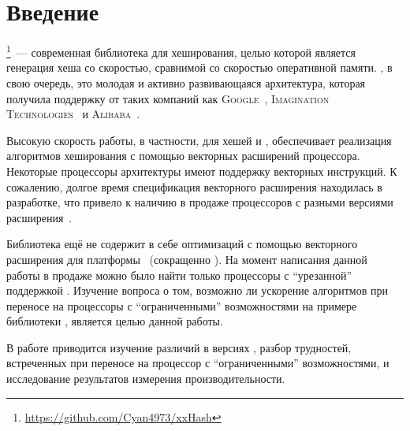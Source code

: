 
\section*{Введение}
\thispagestyle{withCompileDate}

\xxHash{}\footnote{\url{https://github.com/Cyan4973/xxHash}}~--- современная библиотека для хеширования, целью которой является генерация хеша со скоростью, сравнимой со скоростью оперативной памяти.
\riscv{}, в свою очередь, это молодая и активно развивающаяся архитектура, которая получила поддержку от таких компаний как \textsc{Google}~\cite{GoogleAnnouncesOfficial}, \textsc{Imagination Technologies}~\cite{WhyWeVe} и \textsc{Alibaba}~\cite{robinsonAlibabaLaunchesRISCV}.

Высокую скорость работы, в частности, для хешей  и , обеспечивает реализация алгоритмов хеширования с помощью векторных расширений процессора.
Некоторые процессоры архитектуры \riscv{} имеют поддержку векторных инструкций.
К сожалению, долгое время спецификация векторного расширения находилась в разработке, что привело к наличию в продаже процессоров с разными версиями расширения~\cite{ImplicationsWidelyDistributed}.

Библиотека \xxHash{} ещё не содержит в себе оптимизаций с помощью векторного расширения для платформы \riscv{}~(сокращенно \rvv{}).
На момент написания данной работы в продаже можно было найти только процессоры с \enquote{урезанной} поддержкой \rvv{}.
Изучение вопроса о том, возможно ли ускорение алгоритмов при переносе на процессоры с \enquote{ограниченными} возможностями на примере библиотеки \xxHash{}, является целью данной работы.

В работе приводится изучение различий в версиях \rvv{}, разбор трудностей, встреченных при переносе на процессор с \enquote{ограниченными} возможностями, и исследование результатов измерения производительности.
